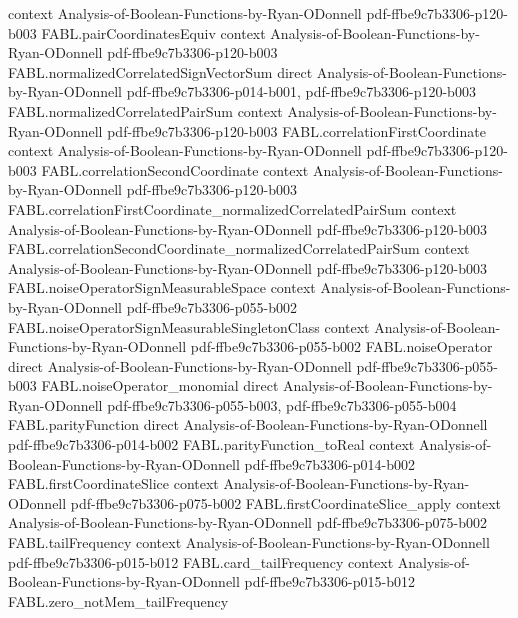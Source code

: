 \begin{theorem}
  {context}
  {Analysis-of-Boolean-Functions-by-Ryan-ODonnell}
  {pdf-ffbe9c7b3306-p120-b003}
\proofstep
  {FABL.pairCoordinatesEquiv}
  {context}
  {Analysis-of-Boolean-Functions-by-Ryan-ODonnell}
  {pdf-ffbe9c7b3306-p120-b003}
\proofstep
  {FABL.normalizedCorrelatedSignVectorSum}
  {direct}
  {Analysis-of-Boolean-Functions-by-Ryan-ODonnell}
  {pdf-ffbe9c7b3306-p014-b001,
    pdf-ffbe9c7b3306-p120-b003}
\proofstep
  {FABL.normalizedCorrelatedPairSum}
  {context}
  {Analysis-of-Boolean-Functions-by-Ryan-ODonnell}
  {pdf-ffbe9c7b3306-p120-b003}
\proofstep
  {FABL.correlationFirstCoordinate}
  {context}
  {Analysis-of-Boolean-Functions-by-Ryan-ODonnell}
  {pdf-ffbe9c7b3306-p120-b003}
\proofstep
  {FABL.correlationSecondCoordinate}
  {context}
  {Analysis-of-Boolean-Functions-by-Ryan-ODonnell}
  {pdf-ffbe9c7b3306-p120-b003}
\proofstep
  {FABL.correlationFirstCoordinate_normalizedCorrelatedPairSum}
  {context}
  {Analysis-of-Boolean-Functions-by-Ryan-ODonnell}
  {pdf-ffbe9c7b3306-p120-b003}
\proofstep
  {FABL.correlationSecondCoordinate_normalizedCorrelatedPairSum}
  {context}
  {Analysis-of-Boolean-Functions-by-Ryan-ODonnell}
  {pdf-ffbe9c7b3306-p120-b003}
\proofstep
  {FABL.noiseOperatorSignMeasurableSpace}
  {context}
  {Analysis-of-Boolean-Functions-by-Ryan-ODonnell}
  {pdf-ffbe9c7b3306-p055-b002}
\proofstep
  {FABL.noiseOperatorSignMeasurableSingletonClass}
  {context}
  {Analysis-of-Boolean-Functions-by-Ryan-ODonnell}
  {pdf-ffbe9c7b3306-p055-b002}
\proofstep
  {FABL.noiseOperator}
  {direct}
  {Analysis-of-Boolean-Functions-by-Ryan-ODonnell}
  {pdf-ffbe9c7b3306-p055-b003}
\proofstep
  {FABL.noiseOperator_monomial}
  {direct}
  {Analysis-of-Boolean-Functions-by-Ryan-ODonnell}
  {pdf-ffbe9c7b3306-p055-b003,
    pdf-ffbe9c7b3306-p055-b004}
\proofstep
  {FABL.parityFunction}
  {direct}
  {Analysis-of-Boolean-Functions-by-Ryan-ODonnell}
  {pdf-ffbe9c7b3306-p014-b002}
\proofstep
  {FABL.parityFunction_toReal}
  {context}
  {Analysis-of-Boolean-Functions-by-Ryan-ODonnell}
  {pdf-ffbe9c7b3306-p014-b002}
\proofstep
  {FABL.firstCoordinateSlice}
  {context}
  {Analysis-of-Boolean-Functions-by-Ryan-ODonnell}
  {pdf-ffbe9c7b3306-p075-b002}
\proofstep
  {FABL.firstCoordinateSlice_apply}
  {context}
  {Analysis-of-Boolean-Functions-by-Ryan-ODonnell}
  {pdf-ffbe9c7b3306-p075-b002}
\proofstep
  {FABL.tailFrequency}
  {context}
  {Analysis-of-Boolean-Functions-by-Ryan-ODonnell}
  {pdf-ffbe9c7b3306-p015-b012}
\proofstep
  {FABL.card_tailFrequency}
  {context}
  {Analysis-of-Boolean-Functions-by-Ryan-ODonnell}
  {pdf-ffbe9c7b3306-p015-b012}
\proofstep
  {FABL.zero_notMem_tailFrequency}

\end{theorem}
